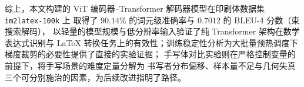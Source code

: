 综上，本文构建的 ViT 编码器--Transformer 解码器模型在印刷体数据集 \texttt{im2latex-100k} 上
取得了 $90.14\%$ 的词元级准确率与 $0.7012$ 的 BLEU-4 分数（束搜索解码），
以轻量的模型规模与低分辨率输入验证了纯 Transformer 架构在数学表达式识别与 LaTeX
转换任务上的有效性；训练稳定性分析为大批量预热调度下梯度裁剪的必要性提供了直接的实验证据；
手写体对比实验则在严格控制变量的前提下，将手写场景的难度定量分解为
书写者分布偏移、样本量不足与几何失真三个可分别施治的因素，为后续改进指明了路径。
